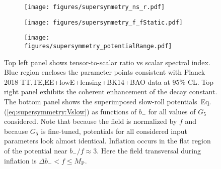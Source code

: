 \documentclass[11pt]{article}
\begin{document}
\begin{figure}
  \centering
  \begin{subfigure}{0.45 \textwidth}
    \texttt{[image: figures/supersymmetry\_ns\_r.pdf]}
  \end{subfigure}
  \begin{subfigure}{0.45 \textwidth}
    \texttt{[image: figures/supersymmetry\_f\_fStatic.pdf]}
  \end{subfigure}
  \begin{subfigure}{0.45 \textwidth}
    \texttt{[image: figures/supersymmetry\_potentialRange.pdf]}
  \end{subfigure}
  \caption{\protect
    Top left panel shows tensor-to-scalar ratio vs scalar spectral index.
    Blue region encloses the parameter points consistent with Planck 2018 TT,TE,EE+lowE+lensing+BK14+BAO data at $95\%$ CL.
    Top right panel exhibits the coherent enhancement of the decay constant.
    The bottom panel shows the superimposed slow-roll potentials~Eq.(\ref{eq:supersymmetry:Vslow}) as functions of $b_-$ for all values of $G_5$ considered.
    Note that because the field is normalized by $f$ and because $G_5$ is fine-tuned, potentials for all considered input parameters look almost identical. Inflation occurs in the flat region of the potential near $b_- / f \approx 3$.
    Here the field transversal during inflation is $\Delta b_- < f \le M_\text{P}$.
  } \label{fig:supersymmetry}
\end{figure}
\end{document}
